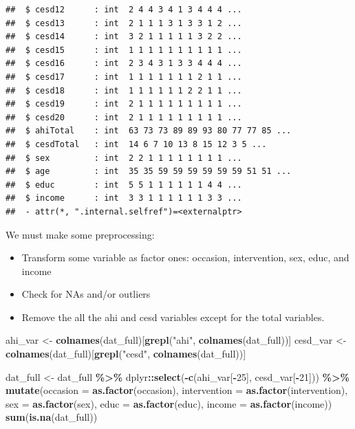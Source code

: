 \documentclass[
]{article}
\newenvironment{Shaded}{\begin{snugshade}}{\end{snugshade}}
\newcommand{\AttributeTok}[1]{\textcolor[rgb]{0.13,0.29,0.53}{#1}}
\newcommand{\DecValTok}[1]{\textcolor[rgb]{0.00,0.00,0.81}{#1}}
\newcommand{\FunctionTok}[1]{\textcolor[rgb]{0.13,0.29,0.53}{\textbf{#1}}}
\newcommand{\NormalTok}[1]{#1}
\newcommand{\OtherTok}[1]{\textcolor[rgb]{0.56,0.35,0.01}{#1}}
\newcommand{\SpecialCharTok}[1]{\textcolor[rgb]{0.81,0.36,0.00}{\textbf{#1}}}
\newcommand{\StringTok}[1]{\textcolor[rgb]{0.31,0.60,0.02}{#1}}
\providecommand{\tightlist}{%
  \setlength{\itemsep}{0pt}\setlength{\parskip}{0pt}}
\begin{document}
\begin{verbatim}
##  $ cesd12      : int  2 4 4 3 4 1 3 4 4 4 ...
##  $ cesd13      : int  2 1 1 1 3 1 3 3 1 2 ...
##  $ cesd14      : int  3 2 1 1 1 1 1 3 2 2 ...
##  $ cesd15      : int  1 1 1 1 1 1 1 1 1 1 ...
##  $ cesd16      : int  2 3 4 3 1 3 3 4 4 4 ...
##  $ cesd17      : int  1 1 1 1 1 1 1 2 1 1 ...
##  $ cesd18      : int  1 1 1 1 1 1 2 2 1 1 ...
##  $ cesd19      : int  2 1 1 1 1 1 1 1 1 1 ...
##  $ cesd20      : int  2 1 1 1 1 1 1 1 1 1 ...
##  $ ahiTotal    : int  63 73 73 89 89 93 80 77 77 85 ...
##  $ cesdTotal   : int  14 6 7 10 13 8 15 12 3 5 ...
##  $ sex         : int  2 2 1 1 1 1 1 1 1 1 ...
##  $ age         : int  35 35 59 59 59 59 59 59 51 51 ...
##  $ educ        : int  5 5 1 1 1 1 1 1 4 4 ...
##  $ income      : int  3 3 1 1 1 1 1 1 3 3 ...
##  - attr(*, ".internal.selfref")=<externalptr>
\end{verbatim}

We must make some preprocessing:

\begin{itemize}
\tightlist
\item
  Transform some variable as factor ones: occasion, intervention, sex,
  educ, and income
\item
  Check for NAs and/or outliers
\item
  Remove the all the ahi and cesd variables except for the total
  variables.
\end{itemize}

\begin{Shaded}
\begin{Highlighting}[]
\NormalTok{ahi\_var }\OtherTok{\textless{}{-}} \FunctionTok{colnames}\NormalTok{(dat\_full)[}\FunctionTok{grepl}\NormalTok{(}\StringTok{"ahi"}\NormalTok{, }\FunctionTok{colnames}\NormalTok{(dat\_full))]}
\NormalTok{cesd\_var }\OtherTok{\textless{}{-}} \FunctionTok{colnames}\NormalTok{(dat\_full)[}\FunctionTok{grepl}\NormalTok{(}\StringTok{"cesd"}\NormalTok{, }\FunctionTok{colnames}\NormalTok{(dat\_full))]}

\NormalTok{dat\_full }\OtherTok{\textless{}{-}}\NormalTok{ dat\_full }\SpecialCharTok{\%\textgreater{}\%}
\NormalTok{  dplyr}\SpecialCharTok{::}\FunctionTok{select}\NormalTok{(}\SpecialCharTok{{-}}\FunctionTok{c}\NormalTok{(ahi\_var[}\SpecialCharTok{{-}}\DecValTok{25}\NormalTok{], cesd\_var[}\SpecialCharTok{{-}}\DecValTok{21}\NormalTok{])) }\SpecialCharTok{\%\textgreater{}\%}
  \FunctionTok{mutate}\NormalTok{(}\AttributeTok{occasion =} \FunctionTok{as.factor}\NormalTok{(occasion),}
         \AttributeTok{intervention =} \FunctionTok{as.factor}\NormalTok{(intervention),}
         \AttributeTok{sex =} \FunctionTok{as.factor}\NormalTok{(sex),}
         \AttributeTok{educ =} \FunctionTok{as.factor}\NormalTok{(educ),}
         \AttributeTok{income =} \FunctionTok{as.factor}\NormalTok{(income))}
\FunctionTok{sum}\NormalTok{(}\FunctionTok{is.na}\NormalTok{(dat\_full))}
\end{Highlighting}
\end{Shaded}
\end{document}
